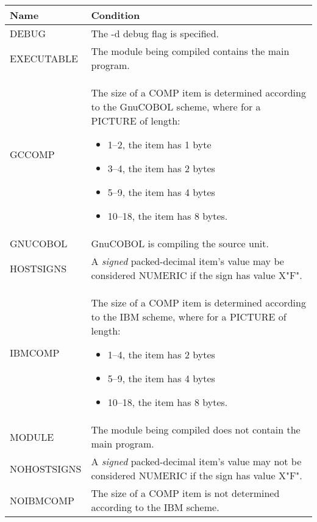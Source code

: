 \begin{centering}
  \begin{longtable}[!h]{p{} p{}}
    \toprule
    \textbf{Name} & \textbf{Condition} \\
    
    \midrule  
    DEBUG & The -d debug flag is specified. \\
    
    EXECUTABLE & The module being compiled contains the main program. \\
    
    GCCOMP & The size of a COMP item is determined according to the GnuCOBOL scheme, where for a PICTURE of length:
    \begin{itemize}
    \item 1--2, the item has 1 byte
    \item 3--4, the item has 2 bytes
    \item 5--9, the item has 4 bytes
    \item 10--18, the item has 8 bytes.
    \end{itemize} \\
    
    GNUCOBOL & GnuCOBOL is compiling the source unit. \\
    
    HOSTSIGNS & A \emph{signed} packed-decimal item's value may be considered NUMERIC if the sign has value X"F". \\
    
    IBMCOMP & The size of a COMP item is determined according to the IBM scheme, where for a PICTURE of length:
    \begin{itemize}
    \item 1--4, the item has 2 bytes
    \item 5--9, the item has 4 bytes
    \item 10--18, the item has 8 bytes.
    \end{itemize} \\
    
    MODULE & The module being compiled does not contain the main program. \\
    
    NOHOSTSIGNS & A \emph{signed} packed-decimal item's value may not be considered NUMERIC if the sign has value X"F". \\
    
    NOIBMCOMP & The size of a COMP item is not determined according to the IBM scheme. \\
    

\end{longtable}
\end{centering}

